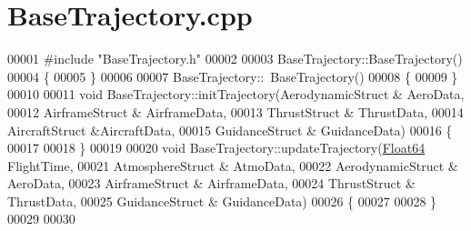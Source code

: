 \hypertarget{_base_trajectory_8cpp_source}{}\section{Base\+Trajectory.\+cpp}
\label{_base_trajectory_8cpp_source}

\begin{DoxyCode}
00001 \textcolor{preprocessor}{#include "BaseTrajectory.h"}
00002 
00003 BaseTrajectory::BaseTrajectory()
00004 \{
00005 \}
00006 
00007 BaseTrajectory::~BaseTrajectory()
00008 \{
00009 \}
00010 
00011 \textcolor{keywordtype}{void} BaseTrajectory::initTrajectory(AerodynamicStruct & AeroData,
00012                                     AirframeStruct & AirframeData,
00013                                     ThrustStruct & ThrustData,
00014                                     AircraftStruct &AircraftData,
00015                                     GuidanceStruct & GuidanceData)
00016 \{
00017 
00018 \}
00019 
00020 \textcolor{keywordtype}{void} BaseTrajectory::updateTrajectory(\hyperlink{group___tools_ga3f1431cb9f76da10f59246d1d743dc2c}{Float64} FlightTime, 
00021                                       AtmosphereStruct & AtmoData, 
00022                                       AerodynamicStruct & AeroData, 
00023                                       AirframeStruct & AirframeData, 
00024                                       ThrustStruct & ThrustData,
00025                                       GuidanceStruct & GuidanceData)
00026 \{
00027 
00028 \}
00029 
00030 
\end{DoxyCode}
